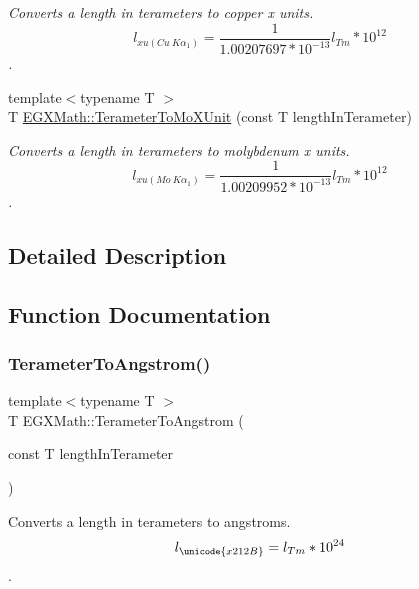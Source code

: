 \begin{DoxyCompactItemize}
\begin{DoxyCompactList}\small\item\em Converts a length in terameters to copper x units. \[ l_{xu(Cu\ K\alpha_1)}= \frac{1}{1.00207697*10^{-13}} l_{Tm} * 10^{12}\]. \end{DoxyCompactList}\item 
{\footnotesize template$<$typename T $>$ }\\T \mbox{\hyperlink{group___e_g_x_math-_conversions-_length_conversions-_terameter-_non-_s_i_ga391bcf9b529c2e20f2773c699bb0197a}{E\+G\+X\+Math\+::\+Terameter\+To\+Mo\+X\+Unit}} (const T length\+In\+Terameter)
\begin{DoxyCompactList}\small\item\em Converts a length in terameters to molybdenum x units. \[ l_{xu(Mo\ K\alpha_1)}=\frac{1}{1.00209952*10^{-13}} l_{Tm} * 10^{12}\]. \end{DoxyCompactList}\end{DoxyCompactItemize}


\subsection{Detailed Description}


\subsection{Function Documentation}
\mbox{\label{group___e_g_x_math-_conversions-_length_conversions-_terameter-_non-_s_i_gaab75399e224bea4ea7ddb8bf5f557ee0}} 
\subsubsection{\texorpdfstring{Terameter\+To\+Angstrom()}{TerameterToAngstrom()}}
{\footnotesize\ttfamily template$<$typename T $>$ \\
T E\+G\+X\+Math\+::\+Terameter\+To\+Angstrom (\begin{DoxyParamCaption}\item[{const T}]{length\+In\+Terameter }\end{DoxyParamCaption})}



Converts a length in terameters to angstroms. \[ l_{\unicode{x212B}}=l_{Tm} * 10^{24} \]. 

